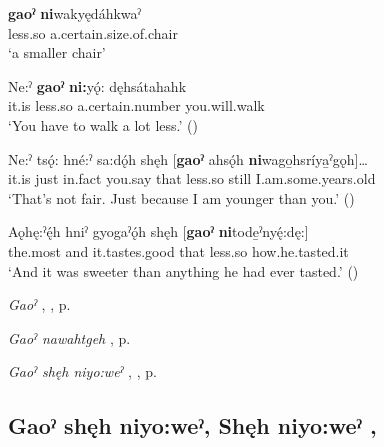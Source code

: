 \ea
\label{ex:gpart35}
\gll \textbf{gaoˀ} \textbf{ni}wakyędáhkwaˀ\\
less.so a.certain.size.of.chair\\
\glt ‘a smaller chair’
\z


\ea
\label{ex:gpart36}
\gll Ne:ˀ \textbf{gaoˀ} \textbf{ni:}yǫ́: dęhsátahahk\\
it.is less.so a.certain.number you.will.walk\\
\glt ‘You have to walk a lot less.’ (\cite{mithun_how_1980})
\z


\ea
\label{ex:gpart37}
\gll Ne:ˀ tsǫ́: hné:ˀ sa:dǫ́h shęh [\textbf{gaoˀ} ahsǫ́h \textbf{ni}wago̱hsríya̱ˀgǫh]…\\
it.is just in.fact you.say that less.so still I.am.some.years.old\\
\glt ‘That’s not fair. Just because I am younger than you.’ (\cite{carrier_legends_2013})
\z


\ea
\label{ex:gpart38}
\gll Aǫhę:ˀę́h hniˀ gyogaˀǫ́h shęh [\textbf{gaoˀ} \textbf{ni}tode̱ˀnyę́:dę:]\\ 
the.most and it.tastes.good that less.so how.he.tasted.it\\
\glt ‘And it was sweeter than anything he had ever tasted.’ (\cite{carrier_legends_2013})
\z


\begin{CayugaRelated}
\item \textit{Gaoˀ} , , p. \pageref{p:[gaoˀ]}\\
\item \textit{Gaoˀ nawahtgeh} , p. \pageref{p:[gaoˀ nawahtgeh]}\\
\item \textit{Gaoˀ shęh niyo:weˀ} , , p. \pageref{p:[gaoˀ shęh niyo:weˀ]}
\end{CayugaRelated}


\subsection*{\textbf{Gaoˀ shęh niyo:weˀ, Shęh niyo:weˀ} , } \label{p:[gaoˀ shęh niyo:weˀ]}

